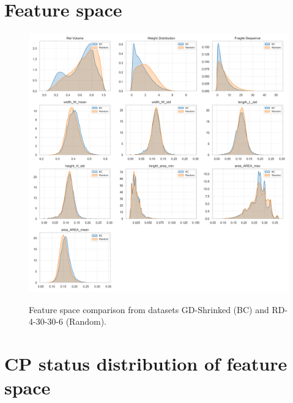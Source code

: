 \section{Feature space}
\label{app:sec:feature_space}
\begin{figure}[!ht]
	\centering
	\includegraphics[width=\textwidth]{pictures/dataset_structure/featureSpace_random_BC.png}
	\label{fig:feature_space}
	\caption{Feature space comparison from datasets GD-Shrinked (BC) and RD-4-30-30-6 (Random).}
\end{figure}
\clearpage

\section{CP status distribution of feature space}
\label{app:sec:feature_space_cpStatus}

